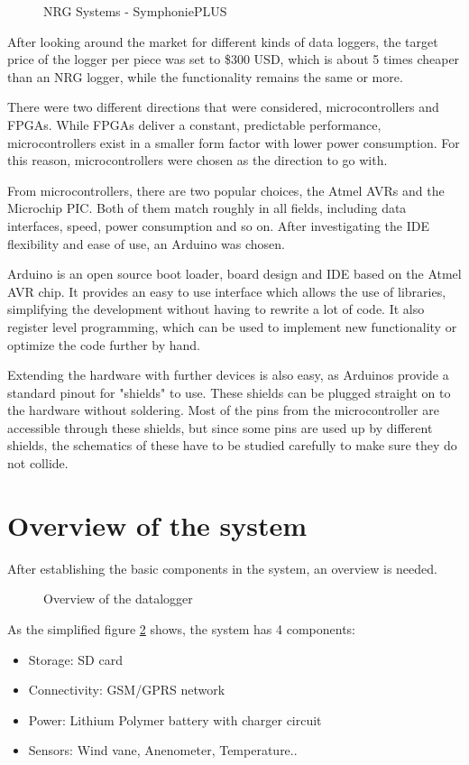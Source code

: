 \documentclass{project}
\begin{document}
\begin{figure}[!ht]
\centering
{}
\caption{NRG Systems - SymphoniePLUS}
\label{NRG}
\end{figure}

After looking around the market for different kinds of data loggers, the target price of the logger per piece was set to \$300 USD, which is about 5 times cheaper than an NRG logger, while the functionality remains the same or more.

There were two different directions that were considered, microcontrollers and FPGAs. While FPGAs deliver a constant, predictable performance, microcontrollers exist in a smaller form factor with lower power consumption. For this reason, microcontrollers were chosen as the direction to go with.

From microcontrollers, there are two popular choices, the Atmel AVRs and the Microchip PIC. Both of them match roughly in all fields, including data interfaces, speed, power consumption and so on. After investigating the IDE flexibility and ease of use, an Arduino was chosen.

Arduino is an open source boot loader, board design and IDE based on the Atmel AVR chip. It provides an easy to use interface which allows the use of libraries, simplifying the development without having to rewrite a lot of code. It also register level programming, which can be used to implement new functionality or optimize the code further by hand.

Extending the hardware with further devices is also easy, as Arduinos provide a standard pinout for "shields" to use. These shields can be plugged straight on to the hardware without soldering. Most of the pins from the microcontroller are accessible through these shields, but since some pins are used up by different shields, the schematics of these have to be studied carefully to make sure they do not collide.

\section{Overview of the system}

After establishing the basic components in the system, an overview is needed.
\begin{figure}[!ht]
\centering
{}
\caption{Overview of the datalogger}
\label{overview}
\end{figure}
As the simplified figure \ref{overview} shows, the system has 4 components:
\begin{itemize}\addtolength{\itemsep}{-0.5\baselineskip}
\item Storage: SD card
\item Connectivity: GSM/GPRS network
\item Power: Lithium Polymer battery with charger circuit
\item Sensors: Wind vane, Anenometer, Temperature..
\end{itemize}
\end{document}
